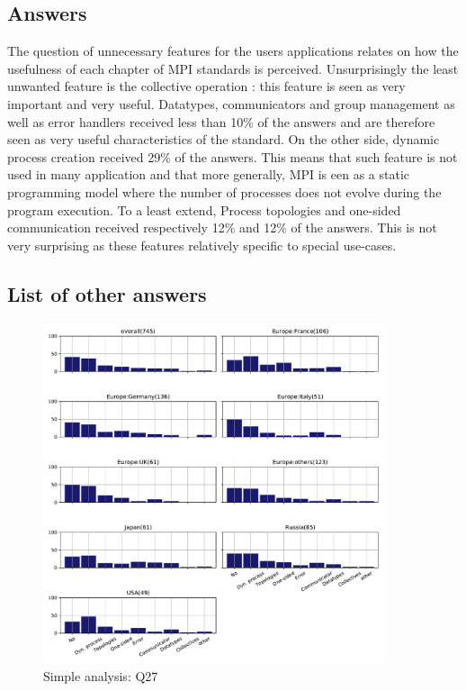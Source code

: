 
\subsection{Answers}


The question of unnecessary features for the users applications relates on how
the usefulness of each chapter of MPI standards is perceived. Unsurprisingly the
least unwanted feature is the collective operation : this feature is seen as
very important and very useful. Datatypes, communicators and group management
as well as  error handlers received less than 10\% of the answers and are
therefore seen as very useful characteristics of the standard. On the other
side, dynamic process creation received 29\% of the answers. This means that
such feature is not used in many application and that more generally, MPI is een
as a static programming model where the number of processes does not evolve
during the program execution. To a least extend, Process topologies and
one-sided communication received respectively 12\% and 12\% of the answers. This
is not very surprising as these features relatively specific to special
use-cases. 

\subsection{List of other answers}
\begin{itemize}

\end{itemize}

\begin{figure}[htb]
\begin{center}
\includegraphics[width=10cm]{../pdfs/Q27.pdf}
\caption{Simple analysis: Q27}
\label{fig:Q27}
\end{center}
\end{figure}
